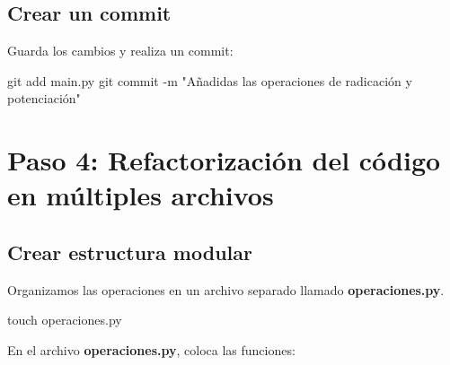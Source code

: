 \documentclass[
  a4paper,
  DIV=11,
  numbers=noendperiod,
  onepage,
  openany]{scrreprt}
\newenvironment{Shaded}{\begin{snugshade}}{\end{snugshade}}
\newcommand{\AttributeTok}[1]{\textcolor[rgb]{0.40,0.45,0.13}{#1}}
\newcommand{\FunctionTok}[1]{\textcolor[rgb]{0.28,0.35,0.67}{#1}}
\newcommand{\NormalTok}[1]{\textcolor[rgb]{0.00,0.23,0.31}{#1}}
\newcommand{\StringTok}[1]{\textcolor[rgb]{0.13,0.47,0.30}{#1}}
\begin{document}
\subsection{Crear un commit}\label{crear-un-commit-1}

Guarda los cambios y realiza un commit:

\begin{Shaded}
\begin{Highlighting}[]
\FunctionTok{git}\NormalTok{ add main.py}
\FunctionTok{git}\NormalTok{ commit }\AttributeTok{{-}m} \StringTok{"Añadidas las operaciones de radicación y potenciación"}
\end{Highlighting}
\end{Shaded}

\section{Paso 4: Refactorización del código en múltiples
archivos}\label{paso-4-refactorizaciuxf3n-del-cuxf3digo-en-muxfaltiples-archivos}

\subsection{Crear estructura modular}\label{crear-estructura-modular}

Organizamos las operaciones en un archivo separado llamado
\textbf{operaciones.py}.

\begin{Shaded}
\begin{Highlighting}[]
\FunctionTok{touch}\NormalTok{ operaciones.py}
\end{Highlighting}
\end{Shaded}

En el archivo \textbf{operaciones.py}, coloca las funciones:
\end{document}
